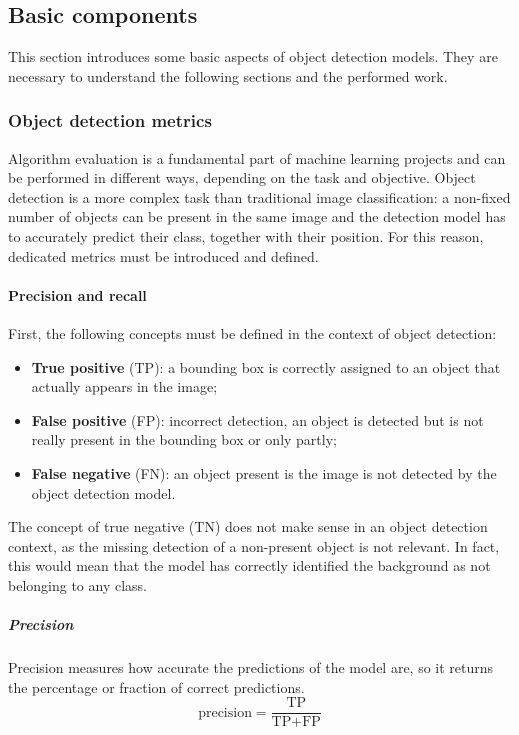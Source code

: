 \documentclass[%
    corpo=12pt,
    twoside,
    stile=classica,   
    tipotesi=magistrale,
    evenboxes,
    english,
	numerazioneromana,
]{toptesi}
\begin{document}
\subsection{Basic components}

This section introduces some basic aspects of object detection models. They are necessary to understand the following sections and the performed work.

\subsubsection{Object detection metrics}
Algorithm evaluation is a fundamental part of machine learning projects and can be performed in different ways, depending on the task and objective. Object detection is a more complex task than traditional image classification: a non-fixed number of objects can be present in the same image and the detection model has to accurately predict their class, together with their position. For this reason, dedicated metrics must be introduced and defined.

\paragraph{Precision and recall}
First, the following concepts must be defined in the context of object detection:
\begin{itemize}
	\item \textbf{True positive} (TP): a bounding box is correctly assigned to an object that actually appears in the image;
	\item \textbf{False positive} (FP): incorrect detection, an object is detected but is not really present in the bounding box or only partly;
	\item \textbf{False negative} (FN): an object present is the image is not detected by the object detection model.
\end{itemize}
The concept of true negative (TN) does not make sense in an object detection context, as the missing detection of a non-present object is not relevant. In fact, this would mean that the model has correctly identified the background as not belonging to any class.

\subparagraph{Precision}
Precision measures how accurate the predictions of the model are, so it returns the percentage or fraction of correct predictions.
\begin{equation}
	\text{precision} = \frac{\text{TP}}{\text{TP}+\text{FP}}
\end{equation}
\end{document}
